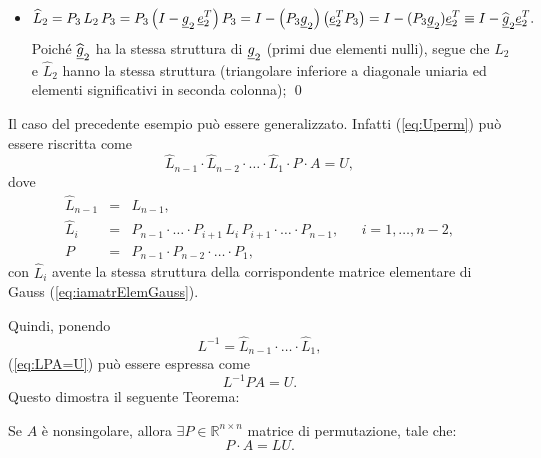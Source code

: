 \begin{example}
\begin{itemize}
        \item \begin{equation*}
            \widehat L_2 = P_3\, L_2\, P_3=P_3\left(I-\uline g_2\,\uline e_2^T\right)P_3 = I-\left(P_3\uline g_2\right)\left(\uline e_2^TP_3\right)=I-(P_3\uline g_2)\uline e_2^T\equiv I-\widehat{\uline g}_2\uline e_2^T.
        \end{equation*} Poiché $\widehat{\uline g}_2$ ha la stessa struttura di $\uline g_2$ (primi due elementi nulli), segue che $L_2$ e $\widehat L_2$ hanno la stessa struttura (triangolare inferiore a diagonale uniaria ed elementi significativi in seconda colonna);
        \qed
    \end{itemize}
    
    \addtocounter{footnote}{-2}
    
    
\end{example}

Il caso del precedente esempio può essere generalizzato. Infatti (\ref{eq:Uperm}) può essere riscritta come 
\begin{equation}\label{eq:LPA=U}
    \widehat L_{n-1}\cdot \widehat L_{n-2}\cdot\hdots\cdot \widehat L_{1}\cdot P \cdot A = U,
\end{equation}
dove
\begin{equation*}
    \begin{matrix}
        \widehat L_{n-1} &=& L_{n-1},\\
        \widehat L_i &=& P_{n-1}\cdot\hdots\cdot P_{i+1}\, L_i\, P_{i+1}\cdot\hdots\cdot P_{n-1}, && i=1,\hdots,n-2,\\
        P &=& P_{n-1}\cdot P_{n-2}\cdot \hdots\cdot P_1,
    \end{matrix}
\end{equation*}
con $\widehat L_i$ avente la stessa struttura della corrispondente matrice elementare di Gauss (\ref{eq:iamatrElemGauss}).

Quindi, ponendo
\begin{equation*}
    L^{-1} = \widehat L_{n-1}\cdot\hdots\cdot\widehat L_1,
\end{equation*}
(\ref{eq:LPA=U}) può essere espressa come
\begin{equation*}
    L^{-1} P A = U.
\end{equation*}
Questo dimostra il seguente Teorema:
\begin{theorem}\label{th:fattLUPerm}\footnotemark
    Se $A$ è \gls{nonsingolare}, allora $\exists P\in\mathbb{R}^{n\times n}$ matrice di permutazione, tale che:
    \begin{equation}\label{eq:PA=LU}
        P\cdot A = LU.
    \end{equation}
\end{theorem}

